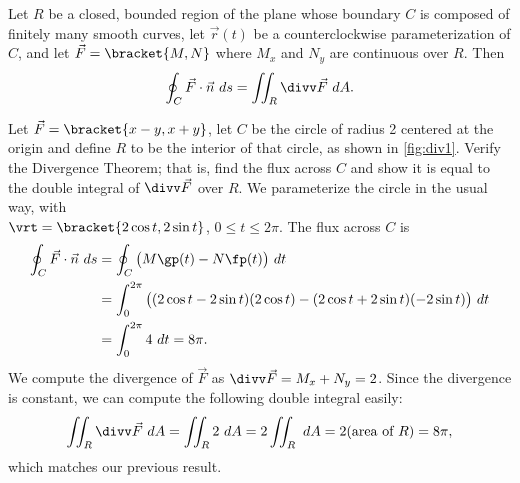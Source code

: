 \begin{theorem}\label{thm:divergence1}
Let $R$ be a closed, bounded region of the plane whose boundary $C$ is composed of finitely many smooth curves, let $\vec r(t)$ be a counterclockwise parameterization of $C$, and let $\vec F =\bracket{M,N}$ where $M_x$ and $N_y$ are continuous over $R$. Then
\[\oint_C \vec F\cdot \vec n\ ds = \iint_R\divv \vec F\ dA.\]
\end{theorem}


\begin{example}\label{ex_div1}
Let $\vec F =\bracket{x-y,x+y}$, let $C$ be the circle of radius 2 centered at the origin and define $R$ to be the interior of that circle, as shown in \autoref{fig:div1}. Verify the Divergence Theorem; that is, find the flux across $C$ and show it is equal to the double integral of $\divv \vec F$ over $R$.
\solution
We parameterize the circle in the usual way, with\\
$\vrt =\bracket{2\cos t,2\sin t}$, $0\leq t\leq 2\pi$. The flux across $C$ is
\begin{align*}
	\oint_C \vec F\cdot \vec n\ ds
	&= \oint_C\big(M\gp(t)-N\fp(t)\big)\ dt\\
	&= \int_0^{2\pi} \big((2\cos t-2\sin t)(2\cos t) - (2\cos t+2\sin t)(-2\sin t)\big)\ dt\\
	&= \int_0^{2\pi} 4\ dt = 8\pi.
\end{align*}
We compute the divergence of $\vec F$ as $\divv \vec F = M_x+N_y = 2$. Since the divergence is constant, we can compute the following double integral easily:
\[
\iint_R \divv \vec F\ dA = \iint_R 2\ dA = 2\iint_R\ dA
= 2(\text{area of $R$}) = 8\pi,
\]
which matches our previous result.
\end{example}

